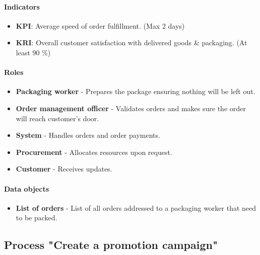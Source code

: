\documentclass[11pt,a4paper]{article}
\begin{document}
\paragraph{Indicators}

\begin{itemize}
    \item \textbf{KPI}: Average speed of order fulfillment. (Max 2 days)
    \item \textbf{KRI}: Overall customer satisfaction with delivered goods \& packaging. (At least 90 \%)
\end{itemize}

\paragraph{Roles}

\begin{itemize}
    \item \textbf{Packaging worker} - Prepares the package ensuring nothing will be left out.
    \item \textbf{Order management officer} - Validates orders and makes sure the order will reach customer's door.
    \item \textbf{System} - Handles orders and order payments.
    \item \textbf{Procurement} - Allocates resources upon request.
    \item \textbf{Customer} - Receives updates.
\end{itemize}

\paragraph{Data objects}

\begin{itemize}
    \item \textbf{List of orders} - List of all orders addressed to a packaging worker that need to be packed.
\end{itemize}

\newpage




\subsection{Process "Create a promotion campaign"}
\end{document}
